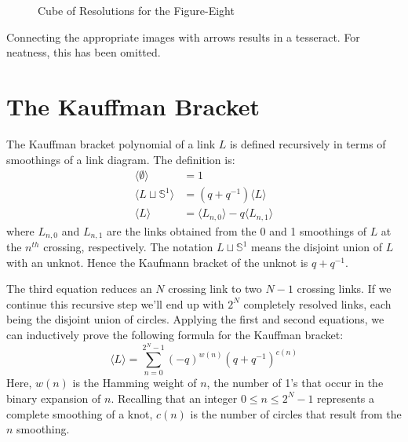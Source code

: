 \documentclass{article}
\theoremstyle{plain}
\begin{document}
        \begin{figure}
            \centering
            \caption{Cube of Resolutions for the Figure-Eight}
            \label{fig:figure_eight_knot_cube_of_resolutions}
        \end{figure}
        Connecting the appropriate images with arrows results in a tesseract.
        For neatness, this has been omitted.
    \section{The Kauffman Bracket}
        The Kauffman bracket polynomial of a link $L$ is defined recursively
        in terms of smoothings of a link diagram. The definition is:
        \begin{align}
            \langle\emptyset\rangle&=1\\
            \langle{L\sqcup\mathbb{S}^{1}}\rangle&=(q+q^{-1})\langle{L}\rangle\\
            \langle{L}\rangle&=
                \langle{L_{n,0}}\rangle-q\langle{L_{n,1}}\rangle
        \end{align}
        where $L_{n,0}$ and $L_{n,1}$ are the links obtained from the
        0 and 1 smoothings of $L$ at the $n^{th}$ crossing, respectively. The
        notation $L\sqcup\mathbb{S}^{1}$ means the disjoint union of
        $L$ with an unknot. Hence the Kaufmann bracket of the
        unknot is $q+q^{-1}$.
        \par\hfill\par
        The third equation reduces an $N$ crossing link to two $N-1$ crossing
        links. If we continue this recursive step we'll end up with
        $2^{N}$ completely resolved links, each being the disjoint union of
        circles. Applying the first and second equations, we can inductively
        prove the following formula for the Kauffman bracket:
        \begin{equation}
            \langle{L}\rangle=\sum_{n=0}^{2^{N}-1}
                (-q)^{w(n)}(q+q^{-1})^{c(n)}
        \end{equation}
        Here, $w(n)$ is the Hamming weight of $n$, the number of 1's
        that occur in the binary expansion of $n$. Recalling that an integer
        $0\leq{n}\leq{2}^{N}-1$ represents a complete smoothing of a knot,
        $c(n)$ is the number of circles that result from the $n$ smoothing.
\end{document}
